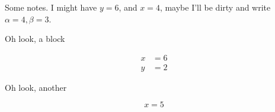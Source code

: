 
Some notes. I might have $y = 6$, and $x = 4$, maybe I'll be dirty and write
$\alpha = 4, \beta = 3$.

Oh look, a block

\begin{align*}
  x &= 6 \\
  y &= 2
\end{align*}

Oh look, another

\[
  x = 5
\]


